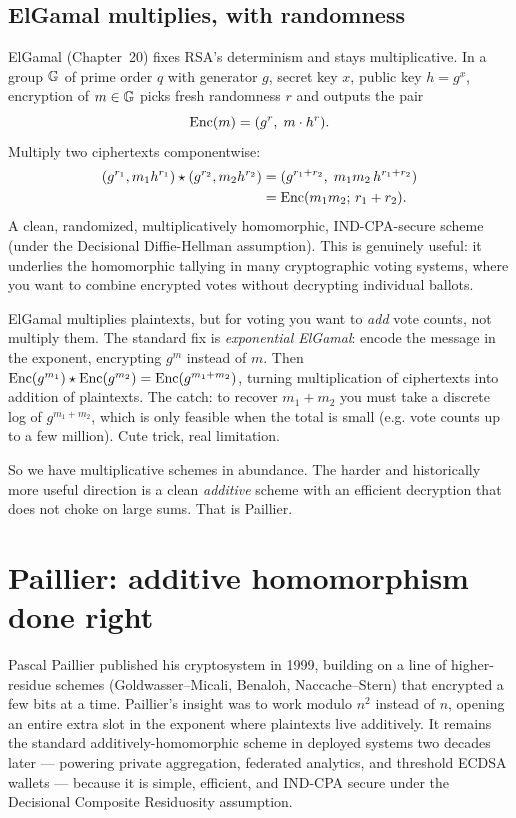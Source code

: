 \subsection{ElGamal multiplies, with randomness}
\label{ch33:elgamal-mult}

ElGamal (Chapter~20) fixes RSA's determinism and stays multiplicative. In a group $\mathbb{G}$ of prime order $q$ with generator $g$, secret key $x$, public key $h = g^x$, encryption of $m\in\mathbb{G}$ picks fresh randomness $r$ and outputs the pair
\[
  \operatorname{Enc}(m) = (g^r,\; m\cdot h^r).
\]
Multiply two ciphertexts componentwise:
\begin{align*}
  (g^{r_1}, m_1 h^{r_1}) \star (g^{r_2}, m_2 h^{r_2}) &= (g^{r_1+r_2},\; m_1 m_2\, h^{r_1+r_2}) \\
  &= \operatorname{Enc}(m_1 m_2;\, r_1+r_2).
\end{align*}
A clean, randomized, multiplicatively homomorphic, IND-CPA-secure scheme (under the Decisional Diffie-Hellman assumption). This is genuinely useful: it underlies the homomorphic tallying in many cryptographic voting systems, where you want to combine encrypted votes without decrypting individual ballots.

\begin{trapbox}
ElGamal multiplies plaintexts, but for voting you want to \emph{add} vote counts, not multiply them. The standard fix is \emph{exponential ElGamal}: encode the message in the exponent, encrypting $g^m$ instead of $m$. Then $\operatorname{Enc}(g^{m_1})\star\operatorname{Enc}(g^{m_2}) = \operatorname{Enc}(g^{m_1+m_2})$, turning multiplication of ciphertexts into addition of plaintexts. The catch: to recover $m_1+m_2$ you must take a discrete log of $g^{m_1+m_2}$, which is only feasible when the total is small (e.g. vote counts up to a few million). Cute trick, real limitation.
\end{trapbox}

So we have multiplicative schemes in abundance. The harder and historically more useful direction is a clean \emph{additive} scheme with an efficient decryption that does not choke on large sums. That is Paillier.

\section{Paillier: additive homomorphism done right}
\label{ch33:paillier}

Pascal Paillier published his cryptosystem in 1999, building on a line of higher-residue schemes (Goldwasser--Micali, Benaloh, Naccache--Stern) that encrypted a few bits at a time. Paillier's insight was to work modulo $n^2$ instead of $n$, opening an entire extra slot in the exponent where plaintexts live additively. It remains the standard additively-homomorphic scheme in deployed systems two decades later --- powering private aggregation, federated analytics, and threshold ECDSA wallets --- because it is simple, efficient, and IND-CPA secure under the Decisional Composite Residuosity assumption.

